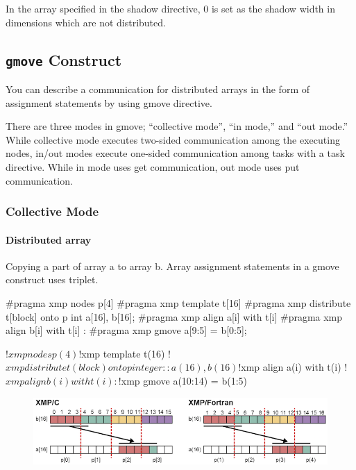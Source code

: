 In the array specified in the shadow directive, 0 is set as the shadow
width in dimensions which are not distributed.


\subsection{{\tt gmove} Construct}

You can describe a communication for distributed arrays in the form of
assignment statements by using gmove directive.

There are three modes in gmove; “collective mode”, “in mode,” and “out
mode.” While collective mode executes two-sided communication among the
executing nodes, in/out modes execute one-sided communication among
tasks with a task directive. While in mode uses get communication, out
mode uses put communication.

\subsubsection{Collective Mode}

\paragraph{Distributed array}

Copying a part of array a to array b. Array assignment statements in a
gmove construct uses triplet.

\begin{XCexample}
#pragma xmp nodes p[4]
#pragma xmp template t[16]
#pragma xmp distribute t[block] onto p
int a[16], b[16];
#pragma xmp align a[i] with t[i]
#pragma xmp align b[i] with t[i]
     :
#pragma xmp gmove
  a[9:5] = b[0:5];
\end{XCexample}

\begin{XFexample}
!$xmp nodes p(4)
!$xmp template t(16)
!$xmp distribute t(block) onto p
integer :: a(16), b(16)
!$xmp align a(i) with t(i)
!$xmp align b(i) with t(i)
     :
!$xmp gmove
  a(10:14) = b(1:5)
\end{XFexample}

\begin{figure}
  \centering
  \includegraphics{figs/gmove.png}
\end{figure}

